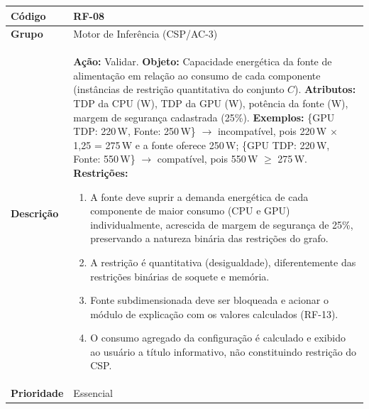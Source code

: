\FloatBarrier
\begin{quadro}[htb]
  \caption{RF-08 -- Validar capacidade energética da fonte (TDP)}
  \label{quad:rf08}
  \begin{tabular}{|p{3.2cm}|p{11.8cm}|}
    \hline
    \textbf{Código}     & RF-08                                                                                                                                                                                            \\ \hline
    \textbf{Grupo}      & Motor de Inferência (CSP/AC-3)                                                                                                                                                                   \\ \hline
    \textbf{Descrição}  &
    \textbf{Ação:} Validar.
    \textbf{Objeto:} Capacidade energética da fonte de alimentação em relação ao consumo de cada componente (instâncias de restrição quantitativa do conjunto $C$).
    \textbf{Atributos:} TDP da CPU (W), TDP da GPU (W), potência da fonte (W), margem de segurança cadastrada (25\%).
    \textbf{Exemplos:} \{GPU TDP: 220\,W, Fonte: 250\,W\} $\rightarrow$ incompatível, pois 220\,W $\times$ 1,25 = 275\,W e a fonte oferece 250\,W; \{GPU TDP: 220\,W, Fonte: 550\,W\} $\rightarrow$ compatível, pois 550\,W $\geq$ 275\,W.
    \textbf{Restrições:}
    \begin{enumerate}[nosep,leftmargin=1.2em,topsep=2pt,partopsep=0pt,parsep=0pt,itemsep=1pt]
      \item A fonte deve suprir a demanda energética de cada componente de maior consumo (CPU e GPU) individualmente, acrescida de margem de segurança de 25\%, preservando a natureza binária das restrições do grafo.
      \item A restrição é quantitativa (desigualdade), diferentemente das restrições binárias de soquete e memória.
      \item Fonte subdimensionada deve ser bloqueada e acionar o módulo de explicação com os valores calculados (RF-13).
      \item O consumo agregado da configuração é calculado e exibido ao usuário a título informativo, não constituindo restrição do CSP.
    \end{enumerate} \\ \hline
    \textbf{Prioridade} & Essencial                                                                                                                                                                                        \\ \hline

\end{tabular}
\end{quadro}
